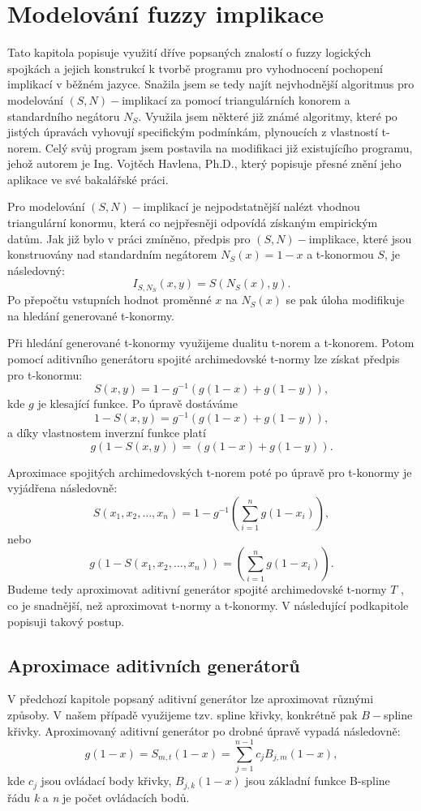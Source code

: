 \section{Modelování fuzzy implikace}
Tato kapitola popisuje využití dříve popsaných znalostí o fuzzy logických spojkách a jejich konstrukcí k tvorbě programu pro vyhodnocení pochopení implikací v běžném jazyce. Snažila jsem se tedy najít nejvhodnější algoritmus pro modelování $(S,N)-$implikací za pomocí triangulárních konorem a standardního negátoru  $N_S$. Využila jsem některé již známé algoritmy, které po jistých \' upravách vyhovují specifickým podmínkám, plynoucích z vlastností t-norem. Celý sv\r uj program jsem postavila na  modifikaci již existujícího programu, jehož autorem je Ing. Vojtěch Havlena, Ph.D., který popisuje přesné znění jeho aplikace ve své bakalářské práci. \cite{havlena}

Pro modelování $(S,N)-$implikací je nejpodstatnější nalézt vhodnou triangulární konormu, která co nejpřesněji odpovídá získaným empirickým dat\r um. Jak již bylo v práci zmíněno, předpis pro $(S,N)-$implikace, které jsou konstruovány nad standardním negátorem $N_S(x) = 1-x$ a t-konormou $S$, je následovný: $$I_{S,N_S}(x,y) = S(N_S(x),y).$$ Po  přepočtu vstupních hodnot proměnné $x$ na $N_S(x)$ se pak úloha modifikuje na hledání generované t-konormy.

Při hledání generované t-konormy využijeme dualitu t-norem a t-konorem. Potom pomocí  aditivního generátoru spojité archimedovské t-normy \cite{alsina} lze získat předpis pro t-konormu:
$$S(x,y) = 1 - g^{-1}(g(1-x) + g(1-y)),$$ 
kde $g$ je klesající funkce. 
Po úpravě dostáváme
$$1-S(x,y) =  g^{-1}(g(1-x) + g(1-y)),$$ 
a díky vlastnostem inverzní funkce platí
$$g(1-S(x,y)) = (g(1-x) + g(1-y)). $$

Aproximace spojitých archimedovských t-norem poté po \' upravě pro t-konormy je vyjádřena následovně: \cite{Beliakov} $$S(x_1, x_2, \dots, x_n) = 1 - g^{-1}\left(\sum_{i = 1}^{n} g(1 - x_i)\right),$$
nebo 
$$g\left(1-S(x_1, x_2, \dots, x_n)\right) = \left(\sum_{i = 1}^{n} g(1 - x_i)\right).$$
Budeme tedy aproximovat aditivní generátor spojité archimedovské t-normy $T$ , co je snadnější, než aproximovat t-normy a t-konormy. V následující podkapitole popisuji takový postup.

\subsection{Aproximace aditivních generátor\r u}
V předchozí kapitole popsaný aditivní generátor  lze aproximovat r\r uznými zp\r usoby. V našem případě využijeme tzv. spline křivky, konkrétně pak $B-$spline křivky. Aproximovaný aditivní generátor po drobné \' upravě vypadá následovně: \cite{Beliakov} $$g(1-x) = S_{m,t}(1-x) = \sum_{j = 1}^{n-1}c_jB_{j,m}(1-x),$$ kde \textit{$c_j$} jsou ovládací body křivky, \textit{$B_{j,k}(1-x)$} jsou základní funkce B-spline řádu \textit{k} a \textit{n} je počet ovládacích bod\r u.

